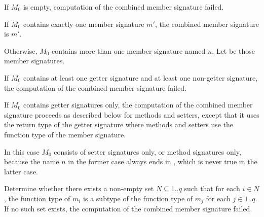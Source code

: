 \documentclass[makeidx]{article}
\begin{document}
\LMHash{}%
If $M_0$ is empty, computation of the combined member signature failed.

\LMHash{}%
If $M_0$ contains exactly one member signature $m'$,
the combined member signature is $m'$.

\LMHash{}%
%
Otherwise, $M_0$ contains more than one member signature named $n$.
Let  be those member signatures.

\LMHash{}%
If $M_0$ contains at least one getter signature
and at least one non-getter signature,
the computation of the combined member signature failed.
\EndCase

\LMHash{}%
If $M_0$ contains getter signatures only,
the computation of the combined member signature proceeds as described below
for methods and setters,
except that it uses the return type of the getter signature
where methods and setters use the function type of the member signature.
\EndCase

\LMHash{}%
In this case $M_0$ consists of setter signatures only,
or method signatures only,
because the name $n$ in the former case always ends in \lit{=},
which is never true in the latter case.

\LMHash{}%
%
Determine whether there exists a non-empty set $N \subseteq 1 .. q$ such that
for each $i \in N$,
the function type of $m_i$ is a subtype of
the function type of $m_j$ for each $j \in 1 .. q$.
%
If no such set exists, the computation of the combined member signature failed.
\end{document}
